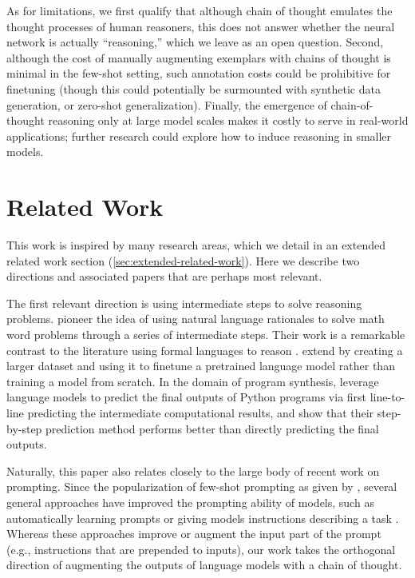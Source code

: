 As for limitations, we first qualify that although chain of thought emulates the thought processes of human reasoners, this does not answer whether the neural network is actually ``reasoning,'' which we leave as an open question.
Second, although the cost of manually augmenting exemplars with chains of thought is minimal in the few-shot setting, such annotation costs could be prohibitive for finetuning (though this could potentially be surmounted with synthetic data generation, or zero-shot generalization).
Finally, the emergence of chain-of-thought reasoning only at large model scales makes it costly to serve in real-world applications; further research could explore how to induce reasoning in smaller models.

\section{Related Work}
This work is inspired by many research areas, which we detail in an extended related work section (\cref{sec:extended-related-work}). Here we describe two directions and associated papers that are perhaps most relevant.

The first relevant direction is using intermediate steps to solve reasoning problems. \cite{ling-etal-2017-program} pioneer the idea of using natural language rationales to solve math word problems through a series of intermediate steps. Their work is a remarkable contrast to the literature using formal languages to reason \citep{roy-2016-reasoning, chiang-chen-2019-semantically, amini-etal-2019-mathqa, chen2019neural}.  \citet{cobbe2021training} extend \citet{ling-etal-2017-program} by creating a larger dataset and using it to finetune a pretrained language model rather than training a model from scratch. In the domain of program synthesis, \cite{nye2021show} leverage language models to predict the final outputs of Python programs via first line-to-line predicting the intermediate computational results, and show that their step-by-step prediction method performs better than directly predicting the final outputs.  

Naturally, this paper also relates closely to the large body of recent work on prompting.
Since the popularization of few-shot prompting as given by \citet{brown2020language}, several general approaches have improved the prompting ability of models, such as automatically learning prompts \citep{lester-etal-2021-power} or giving models instructions describing a task \citep{wei2021finetuned,sanh2021multitask,ouyang2022training}.
Whereas these approaches improve or augment the input part of the prompt (e.g., instructions that are prepended to inputs), our work takes the orthogonal direction of augmenting the outputs of language models with a chain of thought.

